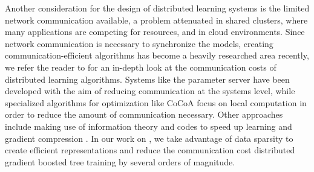 Another consideration for the design of distributed learning systems is the
limited network communication available, a problem attenuated in shared clusters,
where many applications are competing for resources, and in cloud environments.
Since network communication is necessary to synchronize the models, creating
communication-efficient algorithms has become a heavily researched area recently,
we refer the reader to \cite{optimization-communication-complexity} for an in-depth
look at the communication costs of distributed learning algorithms.
Systems like the parameter server have been developed with the aim of reducing communication \cite{muPS}
at the systems level,
while specialized algorithms for optimization like CoCoA \cite{cocoa} focus on local computation
in order to reduce the amount of communication necessary. Other approaches include making use
of information theory and codes to speed up learning \cite{distributed-ml-codes} and gradient
compression \cite{gradient-compression}.
In our work on \blockgbt, we take advantage of data sparsity to create efficient representations
and reduce the communication cost distributed gradient boosted tree training by several orders
of magnitude.
